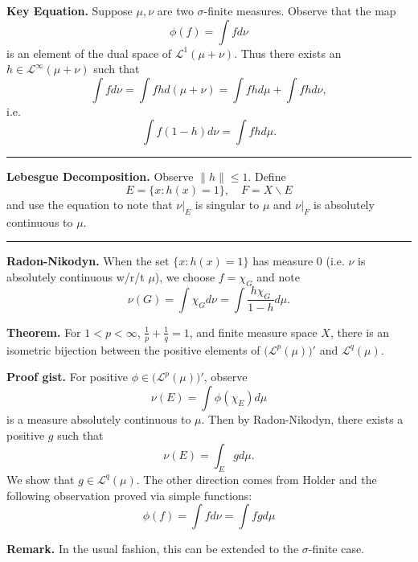 \documentclass[12pt, letterpaper]{article}
\newcommand{\s}{\sigma}
\newcommand{\cL}{{\mathcal L}}
\renewcommand{\i}{\infty}
\begin{document}
\textbf{Key Equation.} Suppose $\mu, \nu$ are two $\sigma$-finite measures. Observe that the map
\[
    \phi(f) = \int f d\nu
\]
is an element of the dual space of $\cL^1(\mu + \nu)$. Thus there exists an $h \in \cL^\i(\mu + \nu)$ such that
\[
    \int f d\nu = \int fh d(\mu + \nu) = \int fh d\mu + \int fh d\nu,
\]
i.e.
\[
    \int f(1-h) d\nu = \int fh d\mu.
\]

\noindent\rule{\textwidth}{1pt}

\textbf{Lebesgue Decomposition.} Observe $\|h\| \leq 1$. Define
\[
    E = \{x : h(x) = 1\}, \quad F = X\backslash E
\]
and use the equation to note that $\nu|_E$ is singular to $\mu$ and $\nu|_F$ is absolutely continuous to $\mu$.

\noindent\rule{\textwidth}{1pt}

\textbf{Radon-Nikodyn.} When the set $\{x : h(x) = 1\}$ has measure 0 (i.e. $\nu$ is absolutely continuous w/r/t $\mu$), we choose $f = \chi_G$ and note
\[
    \nu(G) = \int \chi_G d \nu = \int \frac{h\chi_G}{1 - h} d\mu.
\]

\newpage

\textbf{Theorem.} For $1 < p < \i$, $ \frac{1}{p} + \frac{1}{q} = 1$, and finite measure space $X$, there is an isometric bijection between the positive elements of $\big(\cL^p(\mu)\big)'$ and $\cL^{q}(\mu)$.

\textbf{Proof gist.} For positive $\phi \in \big(\cL^p(\mu)\big)'$, observe
\[
    \nu(E) = \int \phi(\chi_E) d\mu
\]
is a measure absolutely continuous to $\mu$. Then by Radon-Nikodyn, there exists a positive $g$ such that
\[
    \nu(E) = \int_E g d\mu.
\]
We show that $g \in \cL^{q}(\mu)$. The other direction comes from Holder and the following observation proved via simple functions:
\[
    \phi(f) = \int f d\nu = \int fg d\mu
\]

\textbf{Remark.} In the usual fashion, this can be extended to the $\s$-finite case.
\end{document}
